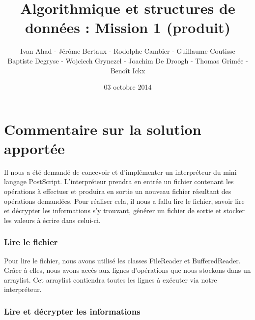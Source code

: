 \documentclass[a4paper]{article}
\title{Algorithmique et structures de données : Mission 1 (produit)}
\date{03 octobre 2014}
\author{Ivan Ahad - Jérôme Bertaux - Rodolphe Cambier - Guillaume Coutisse\\ 
	Baptiste Degryse - Wojciech Grynczel - Joachim De Droogh - Thomas Grimée - Benoît Ickx}
\begin{document}
	
\maketitle

\section*{Commentaire sur la solution apportée}

Il nous a été demandé de concevoir et d'implémenter un interpréteur du mini langage PostScript. L’interpréteur prendra en entrée un fichier contenant les opérations à effectuer et produira en sortie un nouveau fichier résultant des opérations demandées.
Pour réaliser cela, il nous a fallu lire le fichier, savoir lire et décrypter les informations s'y trouvant, générer un fichier de sortie et stocker les valeurs à écrire dans celui-ci.

\subsubsection*{Lire le fichier}

Pour lire le fichier, nous avons utilisé les classes FileReader et BufferedReader. Grâce à elles, nous avons accès aux lignes d'opérations que nous stockons dans un arraylist. Cet arraylist contiendra toutes les lignes à exécuter via notre interpréteur.

\subsubsection*{Lire et décrypter les informations}
\end{document}
